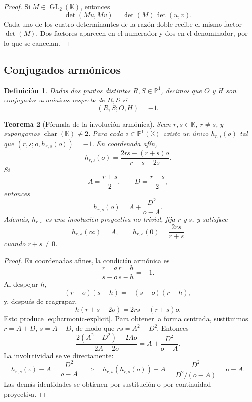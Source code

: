 \documentclass[11pt,oneside]{scrartcl}
\theoremstyle{plainblue}
\newtheorem{theorem}{Teorema}[section]
\theoremstyle{definitionblue}
\newtheorem{definition}[theorem]{Definición}
\theoremstyle{remarkgray}
\newcommand{\KK}{\mathbb{K}}
\newcommand{\PP}{\mathbb{P}}
\newcommand{\GL}{\operatorname{GL}}
\begin{document}
\begin{proof}
Si \(M\in\GL_2(\KK)\), entonces
\[
\det(Mu,Mv)=\det(M)\det(u,v).
\]
Cada uno de los cuatro determinantes de la razón doble recibe el mismo factor
\(\det(M)\). Dos factores aparecen en el numerador y dos en el denominador, por lo
que se cancelan.
\end{proof}

\subsection{Conjugados armónicos}

\begin{definition}
Dados dos puntos distintos \(R,S\in\PP^1\), decimos que \(O\) y \(H\) son
conjugados armónicos respecto de \(R,S\) si
\[
(R,S;O,H)=-1.
\]
\end{definition}

\begin{theorem}[Fórmula de la involución armónica]\label{thm:harmonic-map}
Sean \(r,s\in\KK\), \(r\ne s\), y supongamos \(\operatorname{char}(\KK)\ne2\).
Para cada \(o\in\PP^1(\KK)\) existe un único \(h_{r,s}(o)\) tal que
\((r,s;o,h_{r,s}(o))=-1\). En coordenada afín,
\begin{equation}\label{eq:harmonic-explicit}
h_{r,s}(o)=\frac{2rs-(r+s)o}{r+s-2o}.
\end{equation}
Si
\[
A=\frac{r+s}{2},\qquad D=\frac{r-s}{2},
\]
entonces
\begin{equation}\label{eq:harmonic-centered}
h_{r,s}(o)=A+\frac{D^2}{o-A}.
\end{equation}
Además, \(h_{r,s}\) es una involución proyectiva no trivial, fija \(r\) y \(s\), y
satisface
\[
h_{r,s}(\infty)=A,
\qquad
h_{r,s}(0)=\frac{2rs}{r+s}
\]
cuando \(r+s\ne0\).
\end{theorem}

\begin{proof}
En coordenadas afines, la condición armónica es
\[
\frac{r-o}{s-o}\frac{r-h}{s-h}=-1.
\]
Al despejar \(h\),
\[
(r-o)(s-h)=-(s-o)(r-h),
\]
y, después de reagrupar,
\[
h(r+s-2o)=2rs-(r+s)o.
\]
Esto produce \cref{eq:harmonic-explicit}. Para obtener la forma centrada, sustituimos
\(r=A+D\), \(s=A-D\), de modo que \(rs=A^2-D^2\). Entonces
\[
\frac{2(A^2-D^2)-2Ao}{2A-2o}
=A+\frac{D^2}{o-A}.
\]
La involutividad se ve directamente:
\[
h_{r,s}(o)-A=\frac{D^2}{o-A}
\quad\Longrightarrow\quad
h_{r,s}(h_{r,s}(o))-A
=\frac{D^2}{D^2/(o-A)}=o-A.
\]
Las demás identidades se obtienen por sustitución o por continuidad proyectiva.
\end{proof}
\end{document}
